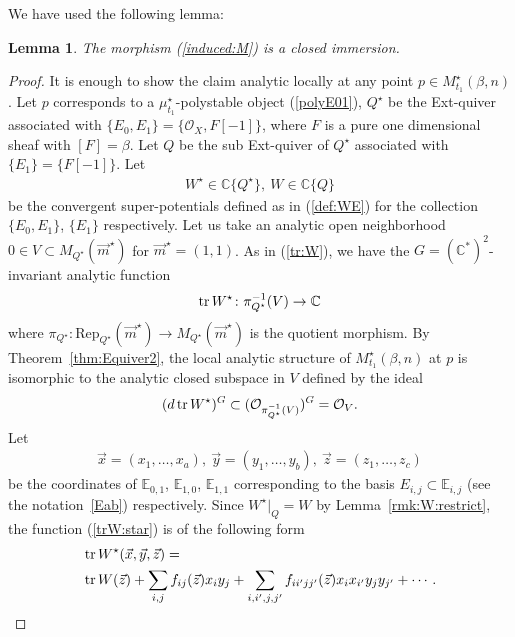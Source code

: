 \documentclass[11pt]{amsart}
\theoremstyle{plain}
\newtheorem{lem}[thm]{Lemma}
\theoremstyle{definition}
\theoremstyle{remark}
\newcommand{\oO}{\mathcal{O}}
\newcommand{\tr}{\mathop{\rm tr}\nolimits}
\begin{document}
We have used the following lemma: 
\begin{lem}\label{prop:isomM}
The morphism (\ref{induced:M}) is a closed immersion. 
\end{lem}
\begin{proof}
It is enough to show the claim 
analytic locally at any point $p \in M_{t_1}^{\star}(\beta, n)$. 
Let $p$ corresponds to a $\mu_{t_1}^{\star}$-polystable 
object (\ref{polyE01}), $Q^{\star}$ be the
Ext-quiver associated with $\{E_0, E_1\}=\{\oO_X, F[-1]\}$, 
where $F$ is a pure one dimensional sheaf with 
$[F]=\beta$.
Let $Q$ be the sub Ext-quiver 
of $Q^{\star}$
associated with $\{E_1\}=\{F[-1]\}$. 
Let 
\begin{align*}
W^{\star} \in \mathbb{C}\{Q^{\star}\}, \ 
W \in \mathbb{C}\{Q\}
\end{align*}
be the convergent super-potentials defined 
as in (\ref{def:WE})
for the collection $\{E_0, E_1\}$, $\{E_1\}$ respectively. 
Let us take an analytic open neighborhood
$0 \in V \subset M_{Q^{\star}}(\vec{m}^{\star})$
for $\vec{m}^{\star}=(1, 1)$. 
As in (\ref{tr:W}), we have the 
$G=(\mathbb{C}^{\ast})^2$-invariant
analytic function 
\begin{align}\label{trW:star}
\tr W^{\star} \colon 
\pi_{Q^{\star}}^{-1}(V) \to \mathbb{C}
\end{align}
where $\pi_{Q^{\star}} \colon \mathrm{Rep}_{Q^{\star}}(\vec{m}^{\star})
\to M_{Q^{\star}}(\vec{m}^{\star})$ is the quotient morphism. 
By Theorem~\ref{thm:Equiver2}, 
the local analytic structure of $M_{t_1}^{\star}(\beta, n)$ at $p$ is 
isomorphic to the analytic closed subspace in $V$
defined by the ideal
\begin{align}\label{loc:ana}
(d \tr W^{\star})^G \subset 
(\oO_{\pi_{Q^{\star}}^{-1}(V)})^G =\oO_V. 
\end{align}
Let 
\begin{align*}
\vec{x}=(x_1, \ldots, x_a), \ \vec{y}=(y_1, \ldots, y_{b}), \ 
\vec{z}=(z_1, \ldots, z_c)
\end{align*} be the coordinates of 
$\mathbb{E}_{0, 1}$, $\mathbb{E}_{1, 0}$, $\mathbb{E}_{1, 1}$
corresponding to the basis $E_{i, j} \subset \mathbb{E}_{i, j}$
(see the notation~\ref{Eab})
respectively. 
Since $W^{\star}|_{Q}=W$ by Lemma~\ref{rmk:W:restrict}, 
the function (\ref{trW:star})
is of the following form
\begin{align}\label{trW}
&\tr W^{\star}(\vec{x}, \vec{y}, \vec{z})= \\
\notag
&\tr W(\vec{z})+\sum_{i,j}f_{ij}(\vec{z})x_i y_j+
\sum_{i, i', j, j'} f_{i i' j j'}(\vec{z})x_i x_{i'} y_{j} y_{j'}+\cdots.

\end{align}
\end{proof}
\end{document}
